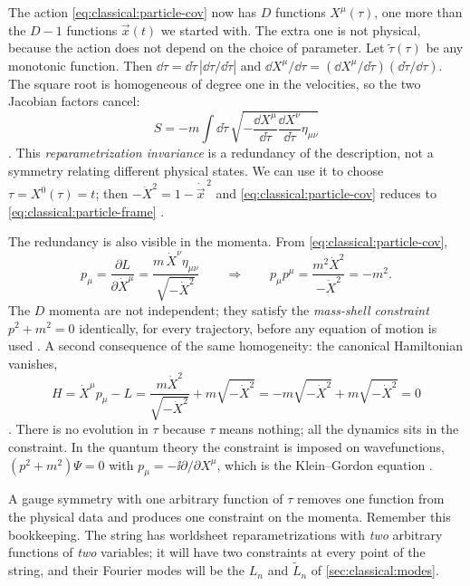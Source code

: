 The action \eqref{eq:classical:particle-cov} now has $D$ functions $X^\mu(\tau)$, one more than
the $D-1$ functions $\vec x(t)$ we started with. The extra one is not physical, because the
action does not depend on the choice of parameter. Let $\tilde\tau(\tau)$ be any monotonic
function. Then $\dd\tau=\dd\tilde\tau\,|\dd\tau/\dd\tilde\tau|$ and
$\dd X^\mu/\dd\tau=(\dd X^\mu/\dd\tilde\tau)(\dd\tilde\tau/\dd\tau)$. The square root is
homogeneous of degree one in the velocities, so the two Jacobian factors cancel:
\begin{equation}\label{eq:classical:reparam}
  S=-m\int\dd\tilde\tau\,\sqrt{-\frac{\dd X^\mu}{\dd\tilde\tau}\frac{\dd X^\nu}{\dd\tilde\tau}\eta_{\mu\nu}}
\end{equation}
. This \emph{reparametrization invariance}%
 is a redundancy of the description, not a symmetry
relating different physical states. We can use it to choose $\tau=X^0(\tau)=t$; then
$-\dot X^2=1-\dot{\vec x}^{\,2}$ and \eqref{eq:classical:particle-cov} reduces to
\eqref{eq:classical:particle-frame} .

The redundancy is also visible in the momenta. From \eqref{eq:classical:particle-cov},
\begin{equation}\label{eq:classical:particle-momenta}
  p_\mu=\frac{\partial L}{\partial\dot X^\mu}=\frac{m\,\dot X^\nu\eta_{\mu\nu}}{\sqrt{-\dot X^2}}
  \qquad\Longrightarrow\qquad
  p_\mu p^\mu=\frac{m^2\dot X^2}{-\dot X^2}=-m^2 .
\end{equation}
The $D$ momenta are not independent; they satisfy the \emph{mass-shell constraint}%
 $p^2+m^2=0$ identically, for every trajectory, before any
equation of motion is used . A second consequence of the same
homogeneity: the canonical Hamiltonian vanishes,
\begin{equation}\label{eq:classical:Hzero}
  H=\dot X^\mu p_\mu-L=\frac{m\dot X^2}{\sqrt{-\dot X^2}}+m\sqrt{-\dot X^2}=-m\sqrt{-\dot X^2}+m\sqrt{-\dot X^2}=0
\end{equation}
. There is no evolution in $\tau$ because $\tau$ means
nothing; all the dynamics sits in the constraint. In the quantum theory the constraint is
imposed on wavefunctions, $(p^2+m^2)\Psi=0$ with $p_\mu=-\ii\partial/\partial X^\mu$, which is
the Klein--Gordon equation .

\begin{physicsbox}
A gauge symmetry with one arbitrary function of $\tau$ removes one function from the
physical data and produces one constraint on the momenta. Remember this bookkeeping. The
string has worldsheet reparametrizations with \emph{two} arbitrary functions of \emph{two}
variables; it will have two constraints at every point of the string, and their Fourier
modes will be the $L_n$ and $\tilde L_n$ of \cref{sec:classical:modes}.
\end{physicsbox}

